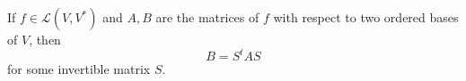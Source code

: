 If $f \in \mathcal{L}(V, V^*)$ and $A, B$ are the matrices of $f$ with respect to two ordered bases of $V$, then
$$B = S^t A S$$
for some invertible matrix $S$.
